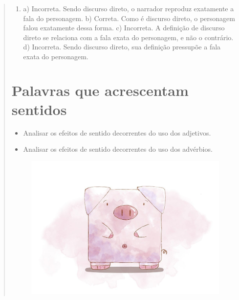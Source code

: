 \begin{quote}
\begin{enumerate}
\item
a) Incorreta. Sendo discurso direto, o narrador reproduz exatamente a
fala do personagem.
b) Correta. Como é discurso direto, o personagem falou exatamente dessa
forma.
c) Incorreta. A definição de discurso direto se relaciona com a fala
exata do personagem, e não o contrário.
d) Incorreta. Sendo discurso direto, sua definição pressupõe a fala
exata do personagem.

\end{enumerate}

\chapter{Palavras que acrescentam sentidos}



\begin{itemize}
\item Analisar os efeitos de sentido decorrentes do uso dos adjetivos.

\item Analisar os efeitos de sentido decorrentes do uso dos advérbios.
\end{itemize}

\begin{figure}[htpb!]
\includegraphics[width=.5\textwidth]{./imgs/img20.jpg}
\end{figure}

\end{quote}
